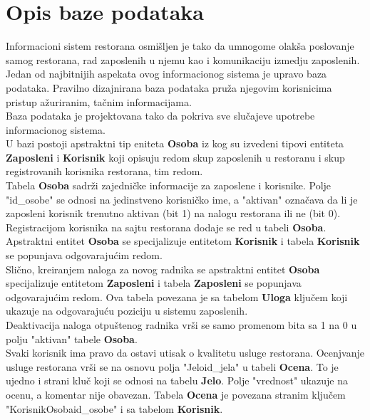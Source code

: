 \newpage
\section{Opis baze podataka}
Informacioni sistem  restorana osmišljen je tako da umnogome olakša poslovanje samog restorana, rad zaposlenih u njemu kao i komunikaciju izmedju zaposlenih. Jedan od najbitnijih aspekata ovog informacionog si\-stema je upravo baza podataka. Pravilno dizajnirana baza podataka pruža njegovim korisnicima pristup ažuriranim, tačnim informacijama. \\
\indent Baza podataka je projektovana tako da pokriva sve slučajeve upotrebe informacionog sistema. \\
\indent U bazi postoji apstraktni tip eniteta \textbf{Osoba} iz kog su izvedeni tipovi entiteta  \textbf{Zaposleni} i \textbf{Korisnik} koji opisuju redom skup zaposlenih u restoranu i skup registrovanih korisnika restorana, tim redom. \\

Tabela \textbf{Osoba} sadrži zajedničke informacije za zaposlene i korisnike. Polje "id\_osobe" se odnosi na jedinstveno korisničko ime, a "aktivan" označava da li je zaposleni korisnik trenutno aktivan (bit 1) na nalogu restorana ili ne (bit 0). \\

\indent Registracijom korisnika na sajtu restorana dodaje se red u tabeli \textbf{Oso\-ba}. Apstraktni entitet \textbf{Osoba} se specijalizuje entitetom \textbf{Korisnik} i tabela \textbf{Korisnik} se popunjava odgovarajućim redom. \\

Slično, kreiranjem naloga za novog radnika se apstraktni entitet \textbf{Osoba} specijalizuje entitetom \textbf{Zaposleni} i tabela \textbf{Zaposleni} se popunjava odgovarajućim redom. Ova tabela povezana je sa tabelom \textbf{Uloga} ključem koji ukazuje na odgovarajuću poziciju u sistemu zaposlenih.\\

Deaktivacija naloga otpuštenog radnika vrši se samo promenom bita sa 1 na 0 u polju "aktivan" tabele \textbf{Osoba}.\\

Svaki korisnik ima pravo da ostavi utisak o kvalitetu usluge restorana. Ocenjvanje usluge restorana vrši se na osnovu polja "Jeloid\_jela" u tabeli \textbf{Ocena}. To je ujedno i strani kluč koji se odnosi na tabelu \textbf{Jelo}. Polje "vrednost" ukazuje na ocenu, a komentar nije obavezan. Tabela \textbf{Ocena} je povezana stranim ključem "KorisnikOsobaid\_osobe" i sa tabelom \textbf{Korisnik}. \\


